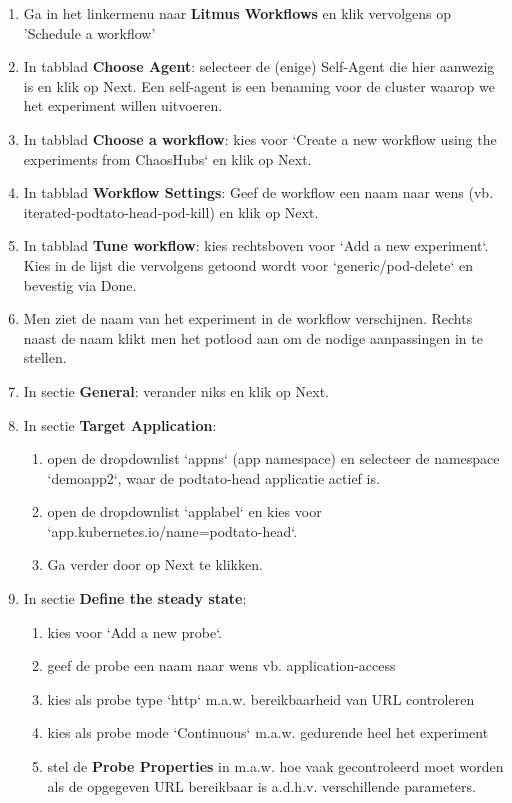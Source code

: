 \begin{enumerate}
    \item Ga in het linkermenu naar {\bf Litmus Workflows} en klik vervolgens op 'Schedule a workflow'
    \item In tabblad {\bf Choose Agent}: selecteer de (enige) Self-Agent die hier aanwezig is en klik op Next. Een self-agent is een benaming voor de cluster waarop we het experiment willen uitvoeren.
    \item In tabblad {\bf Choose a workflow}: kies voor `Create a new workflow using the experiments from ChaosHubs` en klik op Next.
    \item In tabblad {\bf Workflow Settings}: Geef de workflow een naam naar wens (vb. iterated-podtato-head-pod-kill) en klik op Next.
    \item In tabblad {\bf Tune workflow}: kies rechtsboven voor `Add a new experiment`. Kies in de lijst die vervolgens getoond wordt voor `generic/pod-delete` en bevestig via Done.
    \item Men ziet de naam van het experiment in de workflow verschijnen. Rechts naast de naam klikt men het potlood aan om de nodige aanpassingen in te stellen.
    \item In sectie {\bf General}: verander niks en klik op Next.
    \item In sectie {\bf Target Application}:
    \begin{enumerate}
        \item open de dropdownlist `appns` (app namespace) en selecteer de namespace `demoapp2`, waar de podtato-head applicatie actief is.
        \item open de dropdownlist `applabel` en kies voor `app.kubernetes.io/name=podtato-head`.
        \item Ga verder door op Next te klikken.
    \end{enumerate}
    \item In sectie {\bf Define the steady state}:
    \begin{enumerate}
        \item kies voor `Add a new probe`.
        \item geef de probe een naam naar wens vb. application-access
        \item kies als probe type `http` m.a.w. bereikbaarheid van URL controleren
        \item kies als probe mode `Continuous` m.a.w. gedurende heel het experiment
        \item stel de {\bf Probe Properties} in m.a.w. hoe vaak gecontroleerd moet worden als de opgegeven URL bereikbaar is a.d.h.v. verschillende parameters.
        

\end{enumerate}
\end{enumerate}
